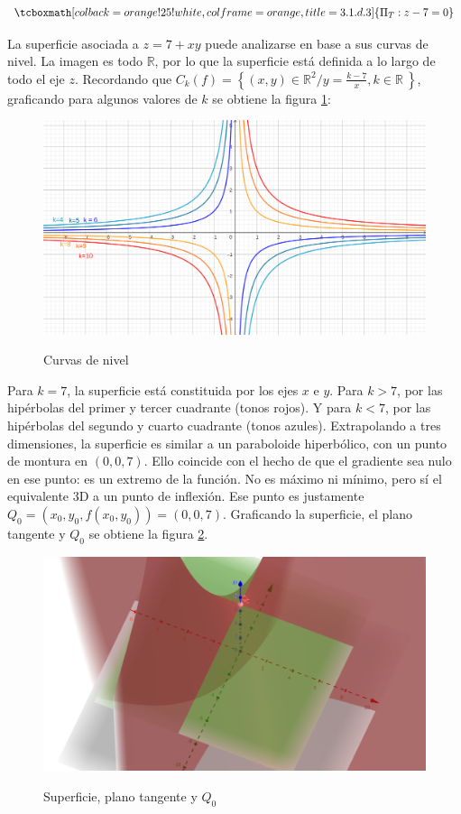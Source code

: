 \documentclass{article}
\begin{document}
\begin{equation}
\tcboxmath[colback=orange!25!white,colframe=orange,title=3.1.d.3]
{
\Pi_T: z-7 = 0
}
\end{equation}

La superficie asociada a $z = 7 + xy$ puede analizarse en base a sus curvas de nivel. La imagen es todo $\mathbb{R}$, por lo que la superficie está definida a lo largo de todo el eje $z$. Recordando que $C_k(f) = \left\{(x,y) \in \mathbb{R}^2 / y = \frac{k-7}{x}, k \in \mathbb{R}\ \right\}$, graficando para algunos valores de $k$ se obtiene la figura \ref{fig:1-d-3-1}:

\begin{figure}[ht]
\caption{Curvas de nivel}
\includegraphics[scale=0.35]{img/ejercicios/3/1-d-3-1.png} 
\centering
\label{fig:1-d-3-1}
\end{figure}

Para $k=7$, la superficie está constituida por los ejes $x$ e $y$. Para $k > 7$, por las hipérbolas del primer y tercer cuadrante (tonos rojos). Y para $k < 7$, por las hipérbolas del segundo y cuarto cuadrante (tonos azules). Extrapolando a tres dimensiones, la superficie es similar a un paraboloide hiperbólico, con un punto de montura en $(0, 0, 7)$. Ello coincide con el hecho de que el gradiente sea nulo en ese punto: es un extremo de la función. No es máximo ni mínimo, pero sí el equivalente 3D a un punto de inflexión. Ese punto es justamente $Q_0 = (x_0, y_0, f(x_0, y_0)) = (0,0,7)$. Graficando la superficie, el plano tangente y $Q_0$ se obtiene la figura \ref{fig:1-d-3-2}.

\begin{figure}[ht]
\caption{Superficie, plano tangente y $Q_0$}
\includegraphics[scale=0.25]{img/ejercicios/3/1-d-3-2.png} 
\centering
\label{fig:1-d-3-2}
\end{figure}
\end{document}
